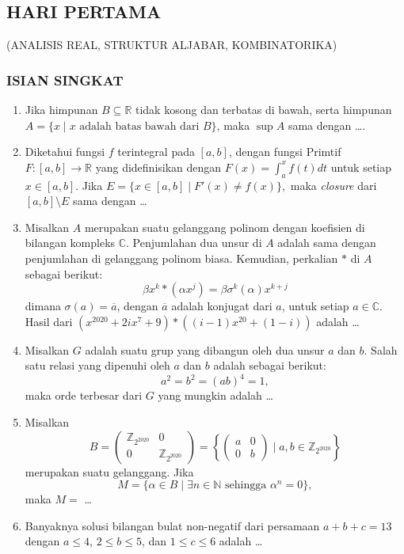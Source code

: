 \documentclass[12pt,twoside]{article}
\begin{document}
\subsection{HARI PERTAMA}
\begin{center}
	(ANALISIS REAL, STRUKTUR ALJABAR, KOMBINATORIKA)
\end{center}
\subsubsection*{ISIAN SINGKAT}
\begin{enumerate}
	\item Jika himpunan $B\subseteq \mathbb{R}$ tidak kosong dan terbatas di bawah, serta himpunan $A=\{x\mid x \text{ adalah batas bawah dari } B\}$, maka $\sup A$ sama dengan \dots.
	\item Diketahui fungsi $f$ terintegral pada $[a,b]$, dengan fungsi Primtif $F : [a,b] \to \mathbb{R}$ yang didefinisikan dengan
	      $
		      F(x) = \int_{a}^{x} f(t) dt
	      $
	      untuk setiap $x \in [a,b]$. Jika  $E = \{x \in [a,b] \mid F'(x) \neq f(x)\},$ maka \textit{closure} dari $[a,b] \setminus E$ sama dengan \dots

	\item Misalkan $A$ merupakan suatu gelanggang polinom dengan koefisien di bilangan kompleks $\mathbb{C}$. Penjumlahan dua unsur di $A$ adalah sama dengan penjumlahan di gelanggang polinom biasa. Kemudian, perkalian $\ast$ di $A$ sebagai berikut:
	      \[
		      \beta x^k \ast (\alpha x^j) = \beta \sigma^k (\alpha) x^{k+j}
	      \]
	      dimana $\sigma(a) = \overline{a}$, dengan $\overline{a}$ adalah konjugat dari $a$, untuk setiap $a \in \mathbb{C}$. Hasil dari $ (x^{2020} + 2ix^7 + 9) \ast ((i - 1)x^{20} + (1 - i))$ adalah \dots

	\item Misalkan $G$ adalah suatu grup yang dibangun oleh dua unsur $a$ dan $b$. Salah satu relasi yang dipenuhi oleh $a$ dan $b$ adalah sebagai berikut:
	      \[
		      a^2 = b^2 = (ab)^4 = 1,
	      \]
	      maka orde terbesar dari $G$ yang mungkin adalah \dots

	\item Misalkan
	      \[
		      B = \begin{pmatrix}
			      \mathbb{Z}_{2^{2020}} & 0                     \\
			      0                     & \mathbb{Z}_{2^{2020}}
		      \end{pmatrix}
		      = \left\{ \begin{pmatrix} a & 0 \\ 0 & b \end{pmatrix} \mid a,b \in \mathbb{Z}_{2^{2020}} \right\}
	      \]
	      merupakan suatu gelanggang. Jika
	      \[
		      M = \{\alpha \in B \mid \exists n \in \mathbb{N} \text{ sehingga } \alpha^n = 0\},
	      \]
	      maka $M =$ \dots

	\item Banyaknya solusi bilangan bulat non-negatif dari persamaan $    a + b + c = 13$
	      dengan $a \leq 4$, $2 \leq b \leq 5$, dan $1 \leq c \leq 6$ adalah \dots
\end{enumerate}
\end{document}
